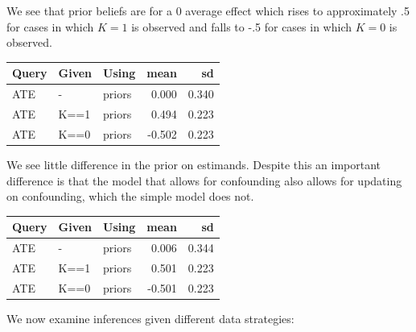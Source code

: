 \documentclass[
  12pt,
]{book}
\begin{document}
We see that prior beliefs are for a 0 average effect which rises to approximately .5 for cases in which \(K=1\) is observed and falls to -.5 for cases in which \(K=0\) is observed.

\begin{tabular}{l|l|l|r|r}
\hline
Query & Given & Using & mean & sd\\
\hline
ATE & - & priors & 0.000 & 0.340\\
\hline
ATE & K==1 & priors & 0.494 & 0.223\\
\hline
ATE & K==0 & priors & -0.502 & 0.223\\
\hline
\end{tabular}

We see little difference in the prior on estimands. Despite this an important difference is that the model that allows for confounding also allows for updating on confounding, which the simple model does not.

\begin{tabular}{l|l|l|r|r}
\hline
Query & Given & Using & mean & sd\\
\hline
ATE & - & priors & 0.006 & 0.344\\
\hline
ATE & K==1 & priors & 0.501 & 0.223\\
\hline
ATE & K==0 & priors & -0.501 & 0.223\\
\hline
\end{tabular}

We now examine inferences given different data strategies:
\end{document}
